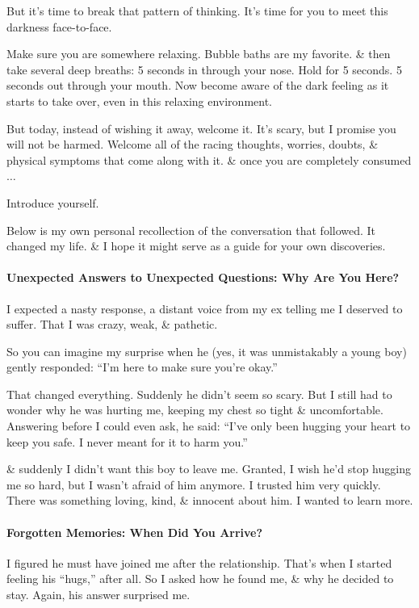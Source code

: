 \documentclass{article}
\numberwithin{equation}{section}
\begin{document}
But it's time to break that pattern of thinking. It's time for you to meet this darkness face-to-face.

Make sure you are somewhere relaxing. Bubble baths are my favorite. \& then take several deep breaths: 5 seconds in through your nose. Hold for 5 seconds. 5 seconds out through your mouth. Now become aware of the dark feeling as it starts to take over, even in this relaxing environment.

But today, instead of wishing it away, welcome it. It's scary, but I promise you will not be harmed. Welcome all of the racing thoughts, worries, doubts, \& physical symptoms that come along with it. \& once you are completely consumed $\ldots$

Introduce yourself.

Below is my own personal recollection of the conversation that followed. It changed my life. \& I hope it might serve as a guide for your own discoveries.

\paragraph{Unexpected Answers to Unexpected Questions: Why Are You Here?} I expected a nasty response, a distant voice from my ex telling me I deserved to suffer. That I was crazy, weak, \& pathetic.

So you can imagine my surprise when he (yes, it was unmistakably a young boy) gently responded: ``I'm here to make sure you're okay.''

That changed everything. Suddenly he didn't seem so scary. But I still had to wonder why he was hurting me, keeping my chest so tight \& uncomfortable. Answering before I could even ask, he said: ``I've only been hugging your heart to keep you safe. I never meant for it to harm you.''

\& suddenly I didn't want this boy to leave me. Granted, I wish he'd stop hugging me so hard, but I wasn't afraid of him anymore. I trusted him very quickly. There was something loving, kind, \& innocent about him. I wanted to learn more.

\paragraph{Forgotten Memories: When Did You Arrive?} I figured he must have joined me after the relationship. That's when I started feeling his ``hugs,'' after all. So I asked how he found me, \& why he decided to stay. Again, his answer surprised me.
\end{document}
